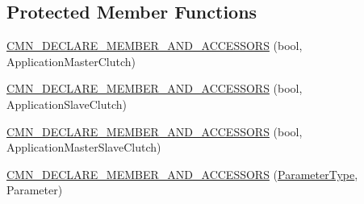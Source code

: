 \subsection*{Protected Member Functions}
\begin{DoxyCompactItemize}
\item 
\hyperlink{classrob_collaborative_control_force_a36739c1857854db3e7269fa7a66ad793}{C\+M\+N\+\_\+\+D\+E\+C\+L\+A\+R\+E\+\_\+\+M\+E\+M\+B\+E\+R\+\_\+\+A\+N\+D\+\_\+\+A\+C\+C\+E\+S\+S\+O\+R\+S} (bool, Application\+Master\+Clutch)
\item 
\hyperlink{classrob_collaborative_control_force_a7ac059710c9685998a1696b466af1a39}{C\+M\+N\+\_\+\+D\+E\+C\+L\+A\+R\+E\+\_\+\+M\+E\+M\+B\+E\+R\+\_\+\+A\+N\+D\+\_\+\+A\+C\+C\+E\+S\+S\+O\+R\+S} (bool, Application\+Slave\+Clutch)
\item 
\hyperlink{classrob_collaborative_control_force_a0f48335dfe86d69b7446cc78422cbd78}{C\+M\+N\+\_\+\+D\+E\+C\+L\+A\+R\+E\+\_\+\+M\+E\+M\+B\+E\+R\+\_\+\+A\+N\+D\+\_\+\+A\+C\+C\+E\+S\+S\+O\+R\+S} (bool, Application\+Master\+Slave\+Clutch)
\item 
\hyperlink{classrob_collaborative_control_force_a3f47e2f6039e766e96f092675abe5ef7}{C\+M\+N\+\_\+\+D\+E\+C\+L\+A\+R\+E\+\_\+\+M\+E\+M\+B\+E\+R\+\_\+\+A\+N\+D\+\_\+\+A\+C\+C\+E\+S\+S\+O\+R\+S} (\hyperlink{classrob_collaborative_control_force_1_1_parameter_type}{Parameter\+Type}, Parameter)
\end{DoxyCompactItemize}
